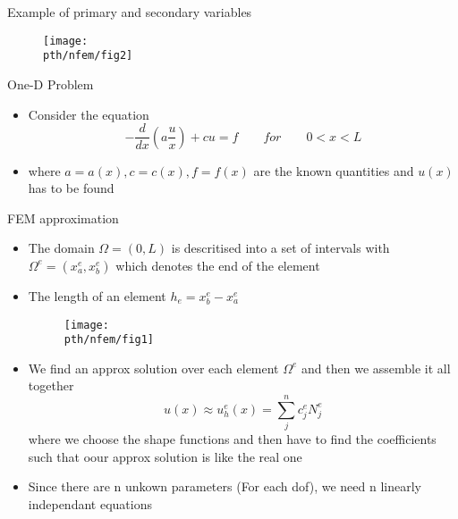 	\begin{frame}{Example of primary and secondary variables}
		\begin{figure}
			\centering
			\texttt{[image: \\pth/nfem/fig2]} 
		\end{figure}
	\end{frame}


	\begin{frame}{One-D Problem}
		\begin{itemize}
			\item Consider the equation
			\begin{equation}
				-\frac{d}{dx}\left(a \frac{u}{x} \right) + cu =  f \qquad for \qquad 0<x<L
			\end{equation}
			\item where $a = a(x), c = c(x), f = f(x)$ are the known quantities and $u(x)$ has to be found		
		\end{itemize}
	\end{frame}


	\begin{frame}{FEM approximation}
		\begin{itemize}
			\item The domain $\Omega = (0,L)$ is descritised into a set of intervals with $\Omega^e = (x_a^e,x_b^e)$ which denotes the end of the element 
			\item  The length of an element $h_e =x_b^e- x_a^e$
			\begin{figure}
				\centering
				\texttt{[image: \\pth/nfem/fig1]} 
			\end{figure}
			\item We find an approx solution over each element $\Omega^e$ and then we assemble it all together
			\begin{equation}
			u(x) \approx u_h^e(x) = \sum_{j}^{n}c^e_jN_j^e
			\end{equation}
			where we choose the shape functions and then have to find the coefficients such that oour approx solution is like the real one
			\item Since there are n unkown parameters (For each dof), we need n linearly independant equations

		\end{itemize}
	\end{frame}



